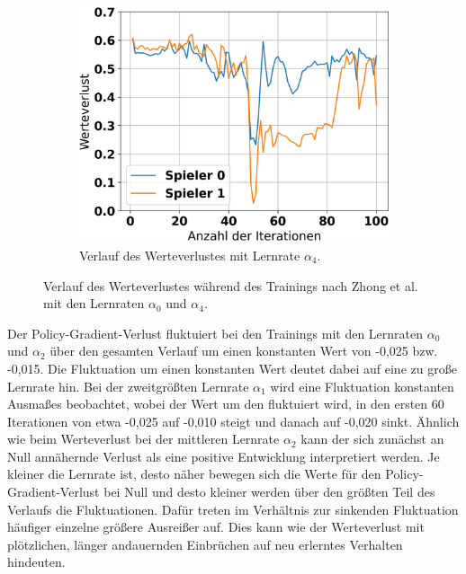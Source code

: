 \begin{figure}[ht!]
\begin{subfigure}[b]{0.32\textwidth}
		\includegraphics[width=\textwidth]{Bilder/ensemble-training/e_0_00001/graph_value_losses.png}
		\caption{Verlauf des Werteverlustes mit Lernrate $\alpha_4$.}
		\label{fig:f15}
	\end{subfigure}
	\caption{Verlauf des Werteverlustes während des Trainings nach Zhong et al. mit den Lernraten $\alpha_0$ und $\alpha_4$.}
\end{figure}

Der Policy-Gradient-Verlust fluktuiert bei den Trainings mit den Lernraten $\alpha_0$ und $\alpha_2$ über den gesamten Verlauf um einen konstanten Wert von -0,025 bzw. -0,015. Die Fluktuation um einen konstanten Wert deutet dabei auf eine zu große Lernrate hin. Bei der zweitgrößten Lernrate $\alpha_1$ wird eine Fluktuation konstanten Ausmaßes beobachtet, wobei der Wert um den fluktuiert wird, in den ersten 60 Iterationen von etwa -0,025 auf -0,010 steigt und danach auf -0,020 sinkt. Ähnlich wie beim Werteverlust bei der mittleren Lernrate $\alpha_2$ kann der sich zunächst an Null annähernde Verlust als eine positive Entwicklung interpretiert werden. Je kleiner die Lernrate ist, desto näher bewegen sich die Werte für den Policy-Gradient-Verlust bei Null und desto kleiner werden über den größten Teil des Verlaufs die Fluktuationen. Dafür treten im Verhältnis zur sinkenden Fluktuation häufiger einzelne größere Ausreißer auf. Dies kann wie der Werteverlust mit plötzlichen, länger andauernden Einbrüchen auf neu erlerntes Verhalten hindeuten.

